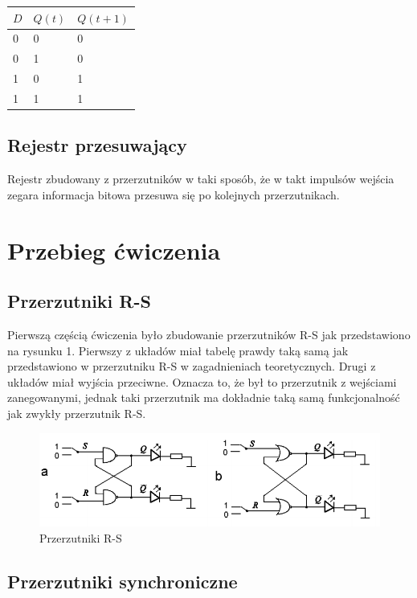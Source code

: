\documentclass[a4paper,11pt]{article}
\begin{document}
\begin{center}
	\begin{tabular}{|l|l|l|}\hline
	$D$ & $Q(t)$ & $Q(t+1)$ \\ \hline
	0 & 0 & 0 \\
	0 & 1 & 0 \\
	1 & 0 & 1 \\
	1 & 1 & 1 \\ \hline
	\end{tabular}
\end{center}

\subsection{Rejestr przesuwający}
Rejestr zbudowany z przerzutników w taki sposób, że w takt impulsów wejścia zegara informacja bitowa przesuwa się po kolejnych przerzutnikach.

\section{Przebieg ćwiczenia}

\subsection{Przerzutniki R-S}

Pierwszą częścią ćwiczenia było zbudowanie przerzutników R-S jak przedstawiono na rysunku 1. Pierwszy z układów miał tabelę prawdy taką samą jak przedstawiono w przerzutniku R-S w zagadnieniach teoretycznych. Drugi z układów miał wyjścia przeciwne. Oznacza to, że był to przerzutnik z wejściami zanegowanymi, jednak taki przerzutnik ma dokładnie taką samą funkcjonalność jak zwykły przerzutnik R-S.

\begin{figure}[ht]
 \begin{center}
  \includegraphics[width=12cm]{screenshot135}
 \end{center}
 \caption{Przerzutniki R-S}
\end{figure}

\subsection{Przerzutniki synchroniczne}
\end{document}
